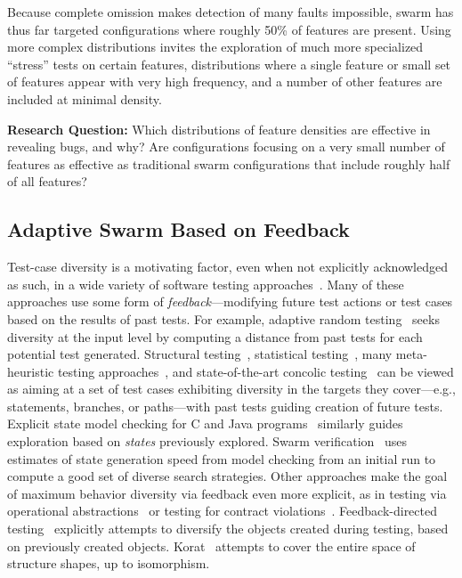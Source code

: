 Because complete omission makes detection of many faults impossible,
swarm has thus far targeted configurations where roughly 50\% of
features are present.  Using more complex distributions invites the exploration of much more specialized ``stress'' tests on certain features, distributions where a single feature or small set of features appear with very high frequency, and a number of other features are included at minimal density.

\begin{framed}
\textbf{Research Question:} 
Which distributions of feature densities are effective in revealing
bugs, and why?
%
Are configurations focusing on a very small number of features as effective as traditional swarm configurations that include roughly half of all features?
\end{framed}


\subsection{Adaptive Swarm Based on Feedback}

Test-case diversity is a motivating factor, even when not explicitly
acknowledged as such, in a wide variety of software testing
approaches~\cite{Chen}.  Many of these approaches use some form of
\emph{feedback}---modifying future test actions or test cases based on
the results of past tests.  
%
For example, adaptive random testing~\cite{ARTChen} seeks diversity at
the input level by computing a distance from past tests for each
potential test generated.  
%
Structural testing~\cite{structtest}, statistical
testing~\cite{stattest}, many meta-heuristic testing
approaches~\cite{searchtest}, and state-of-the-art concolic
testing~\cite{GodefroidKS05,KLEE,Pex,SenMA05} can be viewed as aiming at a set of
test cases exhibiting diversity in the targets they cover---e.g.,
statements, branches, or paths---with past tests guiding creation of
future tests.  Explicit state model checking for C and Java
programs~\cite{ModelDriven,JPFRandTest} similarly guides exploration
based on \emph{states} previously explored.  Swarm
verification~\cite{swarmIEEE} uses estimates of state generation speed
from model checking from an initial run to compute a good set of
diverse search strategies.
%
Other approaches make the goal of maximum behavior diversity via
feedback even more explicit, as in testing via operational
abstractions~\cite{OpAbs} or testing for contract
violations~\cite{MeyerStateful}.  Feedback-directed
testing~\cite{Pacheco} explicitly attempts to diversify the objects
created during testing, based on previously created objects.
Korat~\cite{JavaPred} attempts to cover the entire space of structure
shapes, up to isomorphism.  

